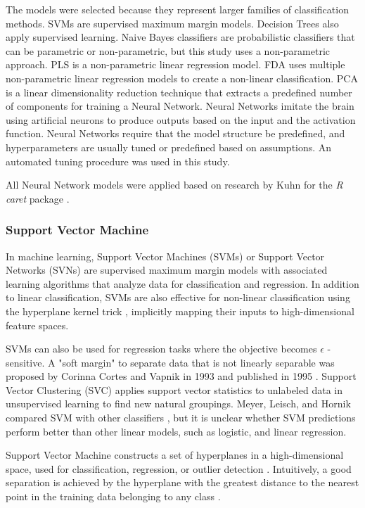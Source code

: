 \documentclass[sn-mathphys-num]{sn-jnl}%
\begin{document}
The models were selected because they represent larger families of classification methods. SVMs are supervised maximum margin models. Decision Trees also apply supervised learning. Naive Bayes classifiers are probabilistic classifiers that can be parametric or non-parametric, but this study uses a non-parametric approach. PLS is a non-parametric linear regression model. FDA uses multiple non-parametric linear regression models to create a non-linear classification. PCA is a linear dimensionality reduction technique that extracts a predefined number of components for training a Neural Network. Neural Networks imitate the brain using artificial neurons to produce outputs based on the input and the activation function. Neural Networks require that the model structure be predefined, and hyperparameters are usually tuned or predefined based on assumptions. An automated tuning procedure was used in this study.

All Neural Network models were applied based on research by Kuhn for the \textit{R} \textit{caret} package \cite{kuhn2013applied, KuhnCaret2024, rprojectProjectStatistical}.

\subsubsection{Support Vector Machine}

In machine learning, Support Vector Machines (SVMs) or Support Vector Networks (SVNs) are supervised maximum margin models with associated learning algorithms that analyze data for classification and regression. In addition to linear classification, SVMs are also effective for non-linear classification using the hyperplane kernel trick \cite{Boser1992}, implicitly mapping their inputs to high-dimensional feature spaces.

SVMs can also be used for regression tasks where the objective becomes $\epsilon$ -sensitive. A "soft margin" to separate data that is not linearly separable was proposed by Corinna Cortes and Vapnik in 1993 and published in 1995 \cite{Cortes1995}. Support Vector Clustering \cite{BenHur2001} (SVC) applies support vector statistics to unlabeled data in unsupervised learning to find new natural groupings. Meyer, Leisch, and Hornik compared SVM with other classifiers \cite{Meyer2003}, but it is unclear whether SVM predictions perform better than other linear models, such as logistic, and linear regression.

Support Vector Machine constructs a set of hyperplanes in a high-dimensional space, used for classification, regression, or outlier detection \cite{scikit-learn2023}. Intuitively, a good separation is achieved by the hyperplane with the greatest distance to the nearest point in the training data belonging to any class \cite{HastieRosset2009}.
\end{document}
